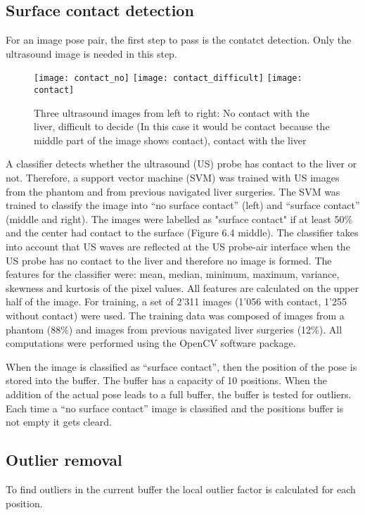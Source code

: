 \subsection{Surface contact detection}
For an image pose pair, the first step to pass is the contatct detection. Only
the ultrasound image is needed in this step. 

\begin{figure}[H]
  \centering
  \texttt{[image: contact\_no]}
  \endminipage
  \hfill
  \texttt{[image: contact\_difficult]}
  \endminipage
  \hfill
  \texttt{[image: contact]}
  \endminipage
  \hfill 
 \caption{Three ultrasound images from left to right: No contact with the liver,
   difficult to decide (In this case it would be contact because the middle part
   of the image shows contact), contact with the liver}
  \label{fig:contactVSnocontact}
\end{figure}

A classifier detects whether the ultrasound (US) probe has contact to the liver or not. Therefore, a support vector machine (SVM) was trained with US images
from the phantom and from previous navigated liver surgeries. The SVM was trained to
classify the image into ``no surface contact'' (left) and ``surface contact'' (middle and right).
The images were labelled as "surface contact" if at least 50\% and the center had contact
to the surface (Figure 6.4 middle). The classifier takes into account that US waves are
reflected at the US probe-air interface when the US probe has no contact to the liver and
therefore no image is formed. The features for the classifier were: mean, median, minimum,
maximum, variance, skewness and kurtosis of the pixel values. All features are calculated
on the upper half of the image. For training, a set of 2'311 images (1'056 with contact, 1'255
without contact) were used. The training data was composed of images from a phantom
(88\%) and images from previous navigated liver surgeries (12\%). All computations were
performed using the OpenCV software package.

When the image is classified as ``surface contact'', then the position of the pose is stored
into the buffer. The buffer has a capacity of 10 positions. When
the addition of the actual pose leads to a full buffer, the buffer is
tested for outliers.
Each time a ``no surface contact'' image is classified and the positions buffer
is not empty it gets cleard.
\subsection{Outlier removal}
To find outliers in the current buffer the local
outlier factor is calculated for each position. 

